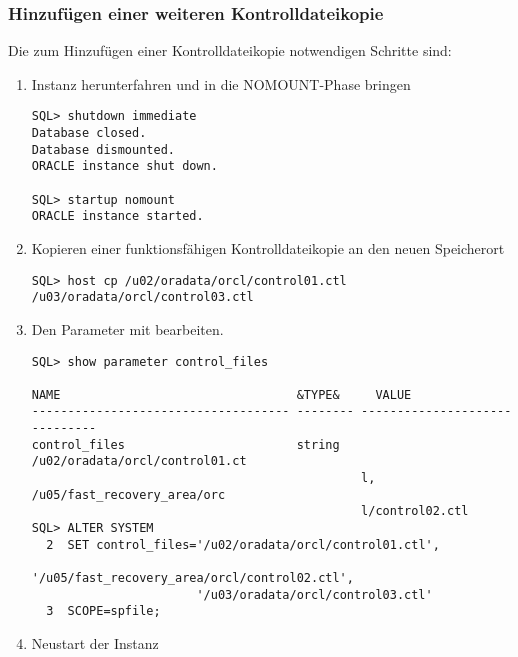         \subsubsection{Hinzufügen einer weiteren Kontrolldateikopie}
          Die zum Hinzufügen einer Kontrolldateikopie notwendigen Schritte sind:
        \begin{enumerate}
          \item Instanz herunterfahren und in die NOMOUNT-Phase bringen
            \begin{lstlisting}[caption={Hinzufügen von Kontrolldateikopien 1},label=admin26,language=sqlplus]
SQL> shutdown immediate
Database closed.
Database dismounted.
ORACLE instance shut down.

SQL> startup nomount
ORACLE instance started.
            \end{lstlisting}
          \item Kopieren einer funktionsfähigen Kontrolldateikopie an den neuen Speicherort
            \begin{lstlisting}[caption={Löschen von Kontrolldateikopien 3},label=admin26a,language=sqlplus]
SQL> host cp /u02/oradata/orcl/control01.ctl /u03/oradata/orcl/control03.ctl
            \end{lstlisting}
          \item Den Parameter  mit  bearbeiten.
            \begin{lstlisting}[caption={Hinzufügen von Kontrolldateikopien 2},label=admin27,language=oracle_sql,alsolanguage=sqlplus]
SQL> show parameter control_files

NAME                                 &TYPE&     VALUE
------------------------------------ -------- ------------------------------
control_files                        string   /u02/oradata/orcl/control01.ct
                                              l, /u05/fast_recovery_area/orc
                                              l/control02.ctl
SQL> ALTER SYSTEM
  2  SET control_files='/u02/oradata/orcl/control01.ctl',
                       '/u05/fast_recovery_area/orcl/control02.ctl',
                       '/u03/oradata/orcl/control03.ctl'
  3  SCOPE=spfile;
            \end{lstlisting}
          \item Neustart der Instanz
        \end{enumerate}

